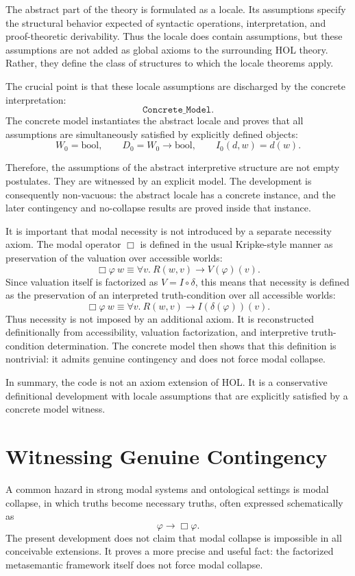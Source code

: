 \documentclass[11pt,a4paper]{article}
\begin{document}
The abstract part of the theory is formulated as a locale. Its assumptions specify the structural behavior expected of syntactic operations, interpretation, and proof-theoretic derivability. Thus the locale does contain assumptions, but these assumptions are not added as global axioms to the surrounding HOL theory. Rather, they define the class of structures to which the locale theorems apply.

The crucial point is that these locale assumptions are discharged by the concrete interpretation:
\[
\texttt{Concrete\_Model}.
\]
The concrete model instantiates the abstract locale and proves that all assumptions are simultaneously satisfied by explicitly defined objects:
\[
W_0 = \mathrm{bool},
\qquad
D_0 = W_0 \to \mathrm{bool},
\qquad
I_0(d,w)=d(w).
\]

Therefore, the assumptions of the abstract interpretive structure are not empty postulates. They are witnessed by an explicit model. The development is consequently non-vacuous: the abstract locale has a concrete instance, and the later contingency and no-collapse results are proved inside that instance.

It is important that modal necessity is not introduced by a separate necessity axiom. The modal operator $\Box$ is defined in the usual Kripke-style manner as preservation of the valuation over accessible worlds:
\[
\Box \varphi\ w \equiv \forall v.\ R(w,v) \longrightarrow V(\varphi)(v).
\]
Since valuation itself is factorized as $V = I \circ \delta$, this means that necessity is defined as the preservation of an interpreted truth-condition over all accessible worlds:
\[
\Box \varphi\ w \equiv \forall v.\ R(w,v) \longrightarrow I(\delta(\varphi))(v).
\]
Thus necessity is not imposed by an additional axiom. It is reconstructed definitionally from accessibility, valuation factorization, and interpretive truth-condition determination. The concrete model then shows that this definition is nontrivial: it admits genuine contingency and does not force modal collapse.

In summary, the code is not an axiom extension of HOL. It is a conservative definitional development with locale assumptions that are explicitly satisfied by a concrete model witness.

\section{Witnessing Genuine Contingency}

A common hazard in strong modal systems and ontological settings is modal collapse, in which truths become necessary truths, often expressed schematically as
\[
\varphi \longrightarrow \Box \varphi.
\]
The present development does not claim that modal collapse is impossible in all conceivable extensions. It proves a more precise and useful fact: the factorized metasemantic framework itself does not force modal collapse.
\end{document}
